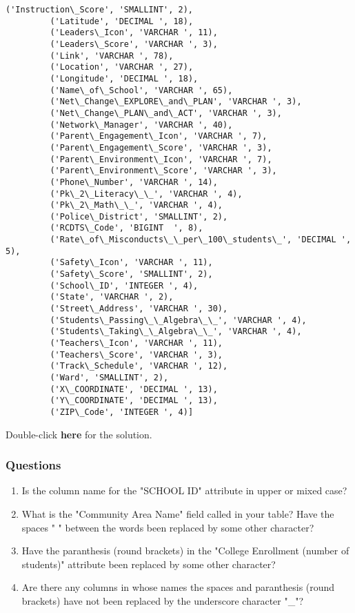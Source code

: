 \documentclass[11pt]{article}
\providecommand{\tightlist}{%
      \setlength{\itemsep}{0pt}\setlength{\parskip}{0pt}}
\begin{document}
\begin{Verbatim}[commandchars=\\\{\}]
         ('Instruction\_Score', 'SMALLINT', 2),
         ('Latitude', 'DECIMAL ', 18),
         ('Leaders\_Icon', 'VARCHAR ', 11),
         ('Leaders\_Score', 'VARCHAR ', 3),
         ('Link', 'VARCHAR ', 78),
         ('Location', 'VARCHAR ', 27),
         ('Longitude', 'DECIMAL ', 18),
         ('Name\_of\_School', 'VARCHAR ', 65),
         ('Net\_Change\_EXPLORE\_and\_PLAN', 'VARCHAR ', 3),
         ('Net\_Change\_PLAN\_and\_ACT', 'VARCHAR ', 3),
         ('Network\_Manager', 'VARCHAR ', 40),
         ('Parent\_Engagement\_Icon', 'VARCHAR ', 7),
         ('Parent\_Engagement\_Score', 'VARCHAR ', 3),
         ('Parent\_Environment\_Icon', 'VARCHAR ', 7),
         ('Parent\_Environment\_Score', 'VARCHAR ', 3),
         ('Phone\_Number', 'VARCHAR ', 14),
         ('Pk\_2\_Literacy\_\_', 'VARCHAR ', 4),
         ('Pk\_2\_Math\_\_', 'VARCHAR ', 4),
         ('Police\_District', 'SMALLINT', 2),
         ('RCDTS\_Code', 'BIGINT  ', 8),
         ('Rate\_of\_Misconducts\_\_per\_100\_students\_', 'DECIMAL ', 5),
         ('Safety\_Icon', 'VARCHAR ', 11),
         ('Safety\_Score', 'SMALLINT', 2),
         ('School\_ID', 'INTEGER ', 4),
         ('State', 'VARCHAR ', 2),
         ('Street\_Address', 'VARCHAR ', 30),
         ('Students\_Passing\_\_Algebra\_\_', 'VARCHAR ', 4),
         ('Students\_Taking\_\_Algebra\_\_', 'VARCHAR ', 4),
         ('Teachers\_Icon', 'VARCHAR ', 11),
         ('Teachers\_Score', 'VARCHAR ', 3),
         ('Track\_Schedule', 'VARCHAR ', 12),
         ('Ward', 'SMALLINT', 2),
         ('X\_COORDINATE', 'DECIMAL ', 13),
         ('Y\_COORDINATE', 'DECIMAL ', 13),
         ('ZIP\_Code', 'INTEGER ', 4)]
\end{Verbatim}
            
    Double-click \textbf{here} for the solution.

    \subsubsection{Questions}\label{questions}

\begin{enumerate}
\def\labelenumi{\arabic{enumi}.}
\tightlist
\item
  Is the column name for the "SCHOOL ID" attribute in upper or mixed
  case?
\item
  What is the "Community Area Name" field called in your table? Have the
  spaces " " between the words been replaced by some other character?
\item
  Have the paranthesis (round brackets) in the "College Enrollment
  (number of students)" attribute been replaced by some other character?
\item
  Are there any columns in whose names the spaces and paranthesis (round
  brackets) have not been replaced by the underscore character "\_"?
\end{enumerate}
\end{document}
